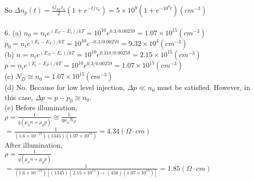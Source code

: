\documentclass[11pt,oneside,a4paper]{article}
\begin{document}
\quad\: So \(\Delta n_p(t)=\frac{G_{L0}\tau_n}{2}(1+e^{-t/\tau_n})=5\times10^9(1+e^{-10^6t}) (cm^{-3})\) \\
\\

6. (a) \(n_0=n_ie^{(E_F-E_i)/kT}=10^{10}e^{0.3/0.00259}=1.07\times10^{15} (cm^{-3})\) \\

\hspace{8.5mm} \(p_0=n_ie^{(E_i-E_F)/kT}=10^{10}e^{-0.3/0.00259}=9.32\times10^4 (cm^{-3})\) \\

\quad (b) \(n=n_ie^{(E_N-E_i)/kT}=10^{10}e^{0.318/0.00259}=2.15\times10^{15} (cm^{-3})\) \\

\hspace{8.5mm} \(p=n_ie^{(E_i-E_P)/kT}=10^{10}e^{0.3/0.00259}=1.07\times10^{15} (cm^{-3})\) \\

\quad (c) \(N_D\cong n_0=1.07\times10^{15} (cm^{-3})\) \\

\quad (d) No. Because for low level injection, \(\Delta p\ll n_0\) must be satisfied. However, in \\

\quad this case, \(\Delta p=p-p_0\cong n_0\). \\

\quad (e) Before illumination, \\

\hspace{8.5mm} \(\rho=\frac{1}{q(\mu_nn+\mu_pp)}\cong\frac{1}{q\mu_nN_D}\) \\

\hspace{8.5mm}\quad \(=\frac{1}{(1.6\times10^{-19})(1345)(1.07\times10^{15})}=4.34 (\Omega\cdot cm)\) \\

\hspace{8.5mm} After illumination, \\

\hspace{8.5mm} \(\rho=\frac{1}{q(\mu_nn+\mu_pp)}\) \\

\hspace{8.5mm}\quad \(=\frac{1}{(1.6\times10^{-19})[(1345)(2.15\times10^{15})+(458)(1.07\times10^{15})]}=1.85 (\Omega\cdot cm)\) \\
\end{document}
